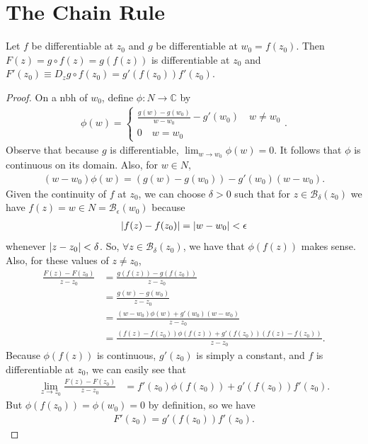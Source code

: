 \documentclass{article}
\theoremstyle{definition}
\newcommand{\f}[2]{\frac{#1}{#2}}
\newcommand{\C}{\mathbb{C}}
\newcommand{\B}{\mathcal{B}}
\newcommand{\nn}{\nonumber}
\begin{document}
\section{The Chain Rule}

Let $f$ be differentiable at $z_0$ and $g$ be differentiable at $w_0 = f(z_0)$. Then $F(z) = g\circ f(z) = g(f(z))$ is differentiable at $z_0$ and $F'(z_0) \equiv D_z g\circ f(z_0) = g'(f(z_0))f'(z_0)$.


\begin{proof}
	On a nbh of $w_0$, define $\phi: N \to \C$ by 
	\begin{align}
	\phi(w) = \begin{cases}
	\f{g(w) - g(w_0)}{w - w_0} - g'(w_0) \quad w \neq w_0\\
	0 \quad w = w_0
	\end{cases}.
	\end{align}
	Observe that because $g$ is differentiable, $\lim_{w\to w_0}\phi(w) = 0$. It follows that $\phi$ is continuous on its domain. Also, for $w \in N$, 
	\begin{align}
	(w - w_0)\phi(w) = (g(w) - g(w_0)) - g'(w_0)(w - w_0).
	\end{align}
	Given the continuity of $f$ at $z_0$, we can choose $\delta > 0$ such that for $z \in \B_\delta(z_0)$ we have $f(z) = w \in N = \B_\epsilon(w_0)$ because
	\begin{align}
	\abs{f(z) - f(z_0)} = \abs{w - w_0} < \epsilon 
	\end{align}
	whenever $\abs{z - z_0} < \delta$. So, $\forall z \in \B_\delta(z_0)$, we have that $\phi(f(z))$ makes sense. Also, for these values of $z \neq z_0$,
	\begin{align}
	\f{F(z) - F(z_0)}{z - z_0} &= \f{g(f(z)) - g(f(z_0))}{z - z_0} \nn\\
	&= \f{g(w) - g(w_0)}{z - z_0} \nn\\
	&= \f{(w - w_0)\phi(w) + g'(w_0)(w - w_0)}{z  - z_0}\nn\\
	&= \f{(f(z) - f(z_0))\phi(f(z)) + g'(f(z_0))(f(z) - f(z_0))}{z  - z_0}.
	\end{align}
	Because $\phi(f(z))$ is continuous, $g'(z_0)$ is simply a constant, and $f$ is differentiable at $z_0$, we can easily see that
	\begin{align}
	\lim_{z \to z_0} \f{F(z) - F(z_0)}{z - z_0} &= f'(z_0)\phi(f(z_0)) + g'(f(z_0))f'(z_0).
	\end{align}
	But $\phi(f(z_0)) = \phi(w_0) = 0$ by definition, so we have
	\begin{align}
	F'(z_0) = g'(f(z_0))f'(z_0).
	\end{align}
\end{proof}
\end{document}
